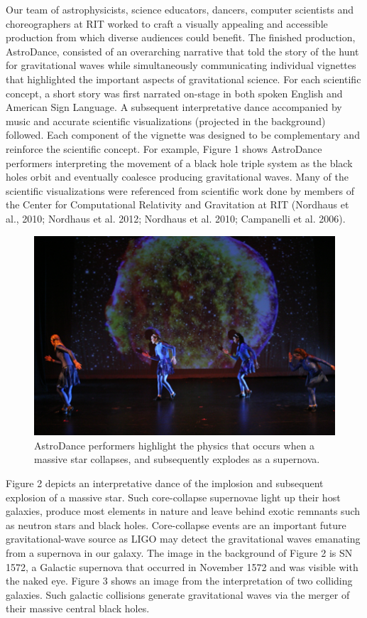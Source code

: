 \documentclass[11.5pt]{sig-alternate} %
\begin{document}
\begin{large}
Our team of astrophysicists, science educators, dancers, computer scientists and choreographers at RIT worked to craft a visually appealing and accessible production from which diverse audiences could benefit.  The finished production, AstroDance, consisted of an overarching narrative that told the story of the hunt for gravitational waves while simultaneously communicating individual vignettes that highlighted the important aspects of gravitational science.  For each scientific concept, a short story was first narrated on-stage in both spoken English and American Sign Language.  A subsequent interpretative dance accompanied by music and accurate scientific visualizations (projected in the background) followed.  Each component of the vignette was designed to be complementary and reinforce the scientific concept.  For example, Figure 1 shows AstroDance performers interpreting the movement of a black hole triple system as the black holes orbit and eventually coalesce producing gravitational waves.  Many of the scientific visualizations were referenced from scientific work done by members of the Center for Computational Relativity and Gravitation at RIT (Nordhaus et al., 2010; Nordhaus et al. 2012; Nordhaus et al. 2010; Campanelli et al. 2006).

\begin{figure}[!h]
    \centering
    \includegraphics[width=1\linewidth]{Fig_2.png}
    \caption{AstroDance performers highlight the physics that occurs when a massive star collapses, and subsequently explodes as a supernova.}
\end{figure}

Figure 2 depicts an interpretative dance of the implosion and subsequent explosion of a massive star.  Such core-collapse supernovae light up their host galaxies, produce most elements in nature and leave behind exotic remnants such as neutron stars and black holes.  Core-collapse events are an important future gravitational-wave source as LIGO may detect the gravitational waves emanating from a supernova in our galaxy.  The image in the background of Figure 2 is SN 1572, a Galactic supernova that occurred in November 1572 and was visible with the naked eye.  Figure 3 shows an image from the interpretation of two colliding galaxies.  Such galactic collisions generate gravitational waves via the merger of their massive central black holes.


\end{large}
\end{document}
